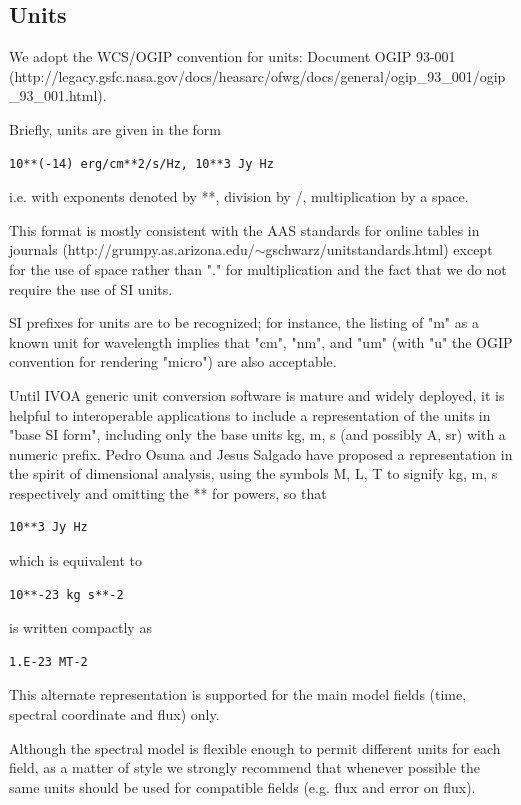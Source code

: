 \documentclass[11pt]{article}
\begin{document}
\clearpage

\subsection{Units}

We adopt the WCS/OGIP convention for units: 
Document OGIP 93-001 \\
(http://legacy.gsfc.nasa.gov/docs/heasarc/ofwg/docs/general/ogip\_93\_001/ogip\_93\_001.html).

Briefly, units are given in the form
\begin{verbatim}
10**(-14) erg/cm**2/s/Hz, 10**3 Jy Hz
\end{verbatim}

i.e. with exponents denoted by **, division by /, multiplication by a space.

This format is mostly consistent with the 
AAS standards for online tables in journals
(http://grumpy.as.arizona.edu/$\sim$gschwarz/unitstandards.html)
except for the use of space rather than "." for multiplication and the 
fact that we do not require the use of SI units.

SI prefixes for units are to be recognized; for instance, the listing of
"m" as a known unit for wavelength implies that "cm", "nm", and "um" (with
"u" the OGIP convention for rendering "micro") are also acceptable.

Until IVOA generic unit conversion software is mature and widely deployed, 
it is helpful to interoperable applications to include a representation
of the units in "base SI form", including only the base units kg, m, s (and
possibly A, sr) with a numeric prefix. Pedro Osuna and Jesus Salgado have proposed
a representation in the spirit of dimensional analysis, using the symbols
M, L, T to signify kg, m, s respectively and omitting the ** for powers, so
that 
\begin{verbatim}
10**3 Jy Hz
\end{verbatim}
which is equivalent to
\begin{verbatim}
10**-23 kg s**-2
\end{verbatim}
is written compactly as
\begin{verbatim}
1.E-23 MT-2
\end{verbatim}

This alternate representation is supported for the
main model fields (time, spectral coordinate and flux) only.



Although the spectral model is flexible enough to permit different units
for each field, as a matter of style we strongly recommend that whenever
possible the
same units should be used for compatible fields (e.g. flux and error on flux).
\end{document}
